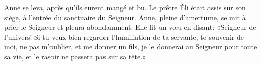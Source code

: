 Anne se leva, après qu’ils eurent mangé et bu.
Le prêtre Éli était assis sur son siège, à l’entrée du sanctuaire du Seigneur.
Anne, pleine d’amertume, se mit à prier le Seigneur et pleura abondamment.
Elle fit un vœu en disant:
	«Seigneur de l’univers! Si tu veux bien regarder l’humiliation de ta servante,
	te souvenir de moi, ne pas m’oublier, et me donner un fils,
	je le donnerai au Seigneur pour toute sa vie,
	et le rasoir ne passera pas sur sa tête.»
